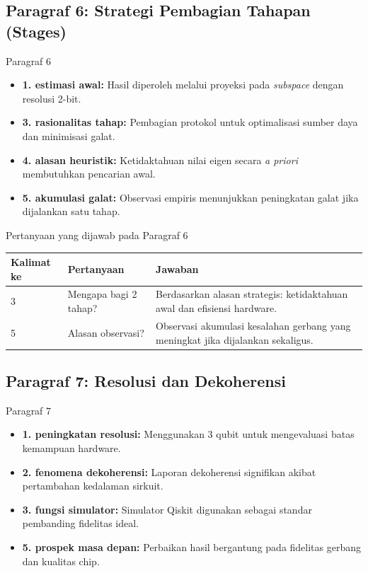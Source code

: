 \subsection{Paragraf 6: Strategi Pembagian Tahapan (Stages)}
\begin{frame}{Paragraf 6}
    \begin{itemize}
        \item \textbf{1. estimasi awal:} Hasil diperoleh melalui proyeksi pada \textit{subspace} dengan resolusi 2-bit.
        \item \textbf{3. rasionalitas tahap:} Pembagian protokol untuk optimalisasi sumber daya dan minimisasi galat.
        \item \textbf{4. alasan heuristik:} Ketidaktahuan nilai eigen secara \textit{a priori} membutuhkan pencarian awal.
        \item \textbf{5. akumulasi galat:} Observasi empiris menunjukkan peningkatan galat jika dijalankan satu tahap.
    \end{itemize}
\end{frame}

\begin{frame}{Pertanyaan yang dijawab pada Paragraf 6}
    \centering
    \small
    \begin{tabular}{lp{4.5cm}p{6cm}}
        \toprule
        Kalimat ke & Pertanyaan & Jawaban \\
        \midrule
        3 & Mengapa bagi 2 tahap? & Berdasarkan alasan strategis: ketidaktahuan awal dan efisiensi hardware. \\
        5 & Alasan observasi? & Observasi akumulasi kesalahan gerbang yang meningkat jika dijalankan sekaligus. \\
        \bottomrule
    \end{tabular}
\end{frame}

\subsection{Paragraf 7: Resolusi dan Dekoherensi}
\begin{frame}{Paragraf 7}
    \begin{itemize}
        \item \textbf{1. peningkatan resolusi:} Menggunakan 3 qubit untuk mengevaluasi batas kemampuan hardware.
        \item \textbf{2. fenomena dekoherensi:} Laporan dekoherensi signifikan akibat pertambahan kedalaman sirkuit.
        \item \textbf{3. fungsi simulator:} Simulator Qiskit digunakan sebagai standar pembanding fidelitas ideal.
        \item \textbf{5. prospek masa depan:} Perbaikan hasil bergantung pada fidelitas gerbang dan kualitas chip.
    \end{itemize}
\end{frame}

